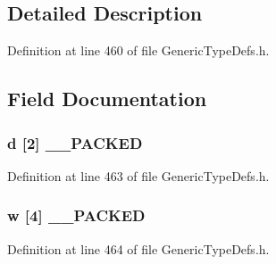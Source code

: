 \subsection{Detailed Description}


Definition at line 460 of file Generic\+Type\+Defs.\+h.



\subsection{Field Documentation}
\hypertarget{union_q_w_o_r_d___v_a_l_a4c364fe30e2e45ad4e325fb041a8c2cf}{}
\subsubsection[{\+\_\+\+\_\+\+P\+A\+C\+K\+E\+D}]{ d \mbox{[}2\mbox{]} {\bf \+\_\+\+\_\+\+P\+A\+C\+K\+E\+D}}\label{union_q_w_o_r_d___v_a_l_a4c364fe30e2e45ad4e325fb041a8c2cf}


Definition at line 463 of file Generic\+Type\+Defs.\+h.

\hypertarget{union_q_w_o_r_d___v_a_l_abdbe55bfd3a80f5c6cf005d7e37910a7}{}
\subsubsection[{\+\_\+\+\_\+\+P\+A\+C\+K\+E\+D}]{ w \mbox{[}4\mbox{]} {\bf \+\_\+\+\_\+\+P\+A\+C\+K\+E\+D}}\label{union_q_w_o_r_d___v_a_l_abdbe55bfd3a80f5c6cf005d7e37910a7}


Definition at line 464 of file Generic\+Type\+Defs.\+h.

\hypertarget{union_q_w_o_r_d___v_a_l_a884b392c82d52eb89059b87a5d288ccf}{}
